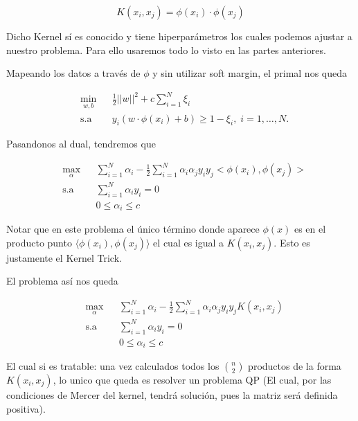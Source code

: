 $$K(x_i, x_j) = \phi(x_i) \cdot \phi(x_j)$$

Dicho Kernel sí es conocido y tiene hiperparámetros los cuales podemos ajustar a nuestro problema. Para ello usaremos todo lo visto en las partes anteriores.

Mapeando los datos a través de $\phi$ y sin utilizar soft margin, el primal nos queda

\begin{equation*}
\begin{aligned}
& \underset{w,b}{\text{min}}
& & \frac{1}{2}||w||^2 + c\sum\limits_{i=1}^{N} \xi_i\\
& \text{s.a}
& & y_i (w\cdot \phi(x_i) +b) \geq 1- \xi_i, \; i = 1, \ldots, N.
\end{aligned}
\end{equation*}

Pasandonos al dual, tendremos que

\begin{equation*}
\begin{aligned}
& \underset{\alpha}{\text{max}}
& & \sum\limits_{i=1}^{N}\alpha_i - \frac{1}{2} \sum\limits_{i=1}^{N} \alpha_i \alpha_j y_i y_j <\phi(x_i), \phi(x_j)>\\
& \text{s.a}
& & \sum\limits_{i=1}^{N} \alpha_i y_i= 0 \\
& &  &0 \leq \alpha_i \leq c
\end{aligned}
\end{equation*}

Notar que en este problema el único término donde aparece $\phi(x)$ es en el producto punto $\langle \phi(x_i), \phi(x_j)\rangle$ el cual es igual a $K(x_i,x_j)$. Esto es justamente el Kernel Trick.

El problema así nos queda

\begin{equation*}
\begin{aligned}
& \underset{\alpha}{\text{max}}
& & \sum\limits_{i=1}^{N}\alpha_i - \frac{1}{2} \sum\limits_{i=1}^{N} \alpha_i \alpha_j y_i y_j K(x_i, x_j)\\
& \text{s.a}
& & \sum\limits_{i=1}^{N} \alpha_i y_i= 0 \\
& &  &0 \leq \alpha_i \leq c
\end{aligned}
\end{equation*}

El cual si es tratable: una vez calculados todos los $\binom{n}{2}$ productos de la forma $K(x_i, x_j)$, lo unico que queda es resolver un problema QP (El cual, por las condiciones de Mercer del kernel, tendrá solución, pues la matriz será definida positiva). 

